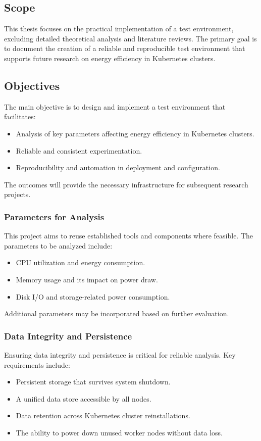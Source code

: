 \subsection{Scope}

This thesis focuses on the practical implementation of a test environment, excluding detailed theoretical analysis and literature reviews. The primary goal is to document the creation of a reliable and reproducible test environment that supports future research on energy efficiency in Kubernetes clusters.

\subsection{Objectives}

The main objective is to design and implement a test environment that facilitates:
\begin{itemize}
\item Analysis of key parameters affecting energy efficiency in Kubernetes clusters.
\item Reliable and consistent experimentation.
\item Reproducibility and automation in deployment and configuration.
\end{itemize}
The outcomes will provide the necessary infrastructure for subsequent research projects.

\subsubsection{Parameters for Analysis}

This project aims to reuse established tools and components where feasible. The parameters to be analyzed include:
\begin{itemize}
\item CPU utilization and energy consumption.
\item Memory usage and its impact on power draw.
\item Disk I/O and storage-related power consumption.
\end{itemize}
Additional parameters may be incorporated based on further evaluation.

\subsubsection{Data Integrity and Persistence}

Ensuring data integrity and persistence is critical for reliable analysis. Key requirements include:
\begin{itemize}
\item Persistent storage that survives system shutdown.
\item A unified data store accessible by all nodes.
\item Data retention across Kubernetes cluster reinstallations.
\item The ability to power down unused worker nodes without data loss.
\end{itemize}

